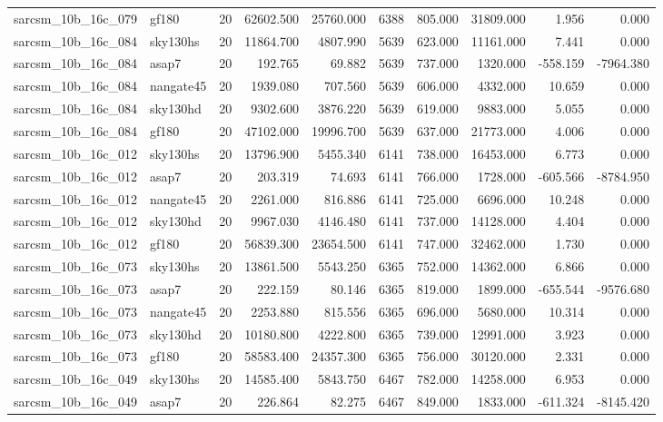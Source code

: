 \begin{longtable}{llrrrrrrrr}
sarcsm\_10b\_16c\_079 & gf180 & 20 & 62602.500 & 25760.000 & 6388 & 805.000 & 31809.000 & 1.956 & 0.000 \\
sarcsm\_10b\_16c\_084 & sky130hs & 20 & 11864.700 & 4807.990 & 5639 & 623.000 & 11161.000 & 7.441 & 0.000 \\
sarcsm\_10b\_16c\_084 & asap7 & 20 & 192.765 & 69.882 & 5639 & 737.000 & 1320.000 & -558.159 & -7964.380 \\
sarcsm\_10b\_16c\_084 & nangate45 & 20 & 1939.080 & 707.560 & 5639 & 606.000 & 4332.000 & 10.659 & 0.000 \\
sarcsm\_10b\_16c\_084 & sky130hd & 20 & 9302.600 & 3876.220 & 5639 & 619.000 & 9883.000 & 5.055 & 0.000 \\
sarcsm\_10b\_16c\_084 & gf180 & 20 & 47102.000 & 19996.700 & 5639 & 637.000 & 21773.000 & 4.006 & 0.000 \\
sarcsm\_10b\_16c\_012 & sky130hs & 20 & 13796.900 & 5455.340 & 6141 & 738.000 & 16453.000 & 6.773 & 0.000 \\
sarcsm\_10b\_16c\_012 & asap7 & 20 & 203.319 & 74.693 & 6141 & 766.000 & 1728.000 & -605.566 & -8784.950 \\
sarcsm\_10b\_16c\_012 & nangate45 & 20 & 2261.000 & 816.886 & 6141 & 725.000 & 6696.000 & 10.248 & 0.000 \\
sarcsm\_10b\_16c\_012 & sky130hd & 20 & 9967.030 & 4146.480 & 6141 & 737.000 & 14128.000 & 4.404 & 0.000 \\
sarcsm\_10b\_16c\_012 & gf180 & 20 & 56839.300 & 23654.500 & 6141 & 747.000 & 32462.000 & 1.730 & 0.000 \\
sarcsm\_10b\_16c\_073 & sky130hs & 20 & 13861.500 & 5543.250 & 6365 & 752.000 & 14362.000 & 6.866 & 0.000 \\
sarcsm\_10b\_16c\_073 & asap7 & 20 & 222.159 & 80.146 & 6365 & 819.000 & 1899.000 & -655.544 & -9576.680 \\
sarcsm\_10b\_16c\_073 & nangate45 & 20 & 2253.880 & 815.556 & 6365 & 696.000 & 5680.000 & 10.314 & 0.000 \\
sarcsm\_10b\_16c\_073 & sky130hd & 20 & 10180.800 & 4222.800 & 6365 & 739.000 & 12991.000 & 3.923 & 0.000 \\
sarcsm\_10b\_16c\_073 & gf180 & 20 & 58583.400 & 24357.300 & 6365 & 756.000 & 30120.000 & 2.331 & 0.000 \\
sarcsm\_10b\_16c\_049 & sky130hs & 20 & 14585.400 & 5843.750 & 6467 & 782.000 & 14258.000 & 6.953 & 0.000 \\
sarcsm\_10b\_16c\_049 & asap7 & 20 & 226.864 & 82.275 & 6467 & 849.000 & 1833.000 & -611.324 & -8145.420 \\

\end{longtable}
